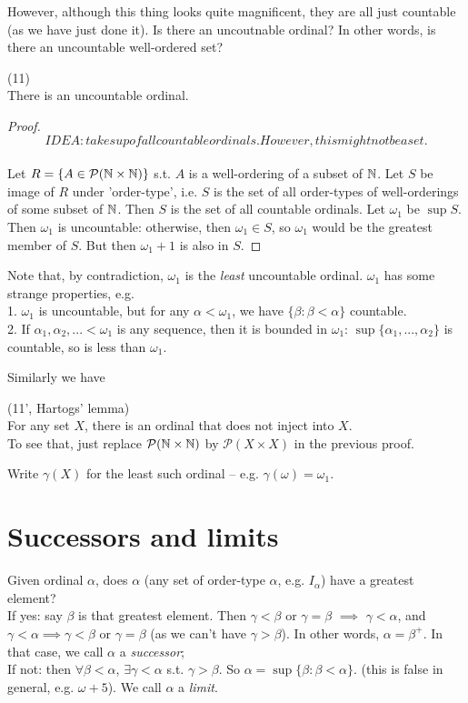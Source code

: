 \documentclass[a4paper]{article}
\begin{document}
However, although this thing looks quite magnificent, they are all just countable (as we have just done it). Is there an uncoutnable ordinal? In other words, is there an uncountable well-ordered set?

\begin{thm} (11)\\
There is an uncountable ordinal.
\begin{proof}
\[IDEA: take sup of all countable ordinals. However, this might not be a set.\]\\
Let $R=\{A \in \mathcal{P}(\mathbb{N} \times \mathbb{N})\}$ s.t. $A$ is a well-ordering of a subset of $\mathbb{N}$. Let $S$ be image of $R$ under 'order-type', i.e. $S$ is the set of all order-types of well-orderings of some subset of $\mathbb{N}$. Then $S$ is the set of all countable ordinals. Let $\omega_1$ be $\sup S$. Then $\omega_1$ is uncountable: otherwise, then $\omega_1 \in S$, so $\omega_1$ would be the greatest member of $S$. But then $\omega_1+1$ is also in $S$.
\end{proof}
\end{thm}

Note that, by contradiction, $\omega_1$ is the \emph{least} uncountable ordinal. $\omega_1$ has some strange properties, e.g.\\
1. $\omega_1$ is uncountable, but for any $\alpha < \omega_1$, we have $\{\beta:\beta < \alpha\}$ countable.\\
2. If $\alpha_1,\alpha_2,... < \omega_1$ is any sequence, then it is bounded in $\omega_1$: $\sup\{\alpha_1,...,\alpha_2\}$ is countable, so is less than $\omega_1$.

Similarly we have

\begin{thm} (11', Hartogs' lemma)\\
For any set $X$, there is an ordinal that  does not inject into $X$.\\
To see that, just replace $\mathcal{P}(\mathbb{N}\times\mathbb{N})$ by $\mathcal{P}(X \times X)$ in the previous proof.\\
\end{thm}

Write $\gamma(X)$ for the least such ordinal -- e.g. $\gamma(\omega) = \omega_1$.

\newpage

\section{Successors and limits}
Given ordinal $\alpha$, does $\alpha$ (any set of order-type $\alpha$, e.g. $I_\alpha$) have a greatest element?\\
If yes: say $\beta$ is that greatest element. Then $\gamma<\beta$ or $\gamma =\beta$ $\implies$ $\gamma<\alpha$, and $\gamma<\alpha \implies \gamma < \beta$ or $\gamma = \beta$ (as we can't have $\gamma > \beta$). In other words, $\alpha = \beta^+$. In that case, we call $\alpha$ a \emph{successor};\\
If not: then $\forall \beta < \alpha$, $\exists \gamma < \alpha$ s.t. $\gamma > \beta$. So $\alpha = \sup\{\beta:\beta < \alpha\}$. (this is false in general, e.g. $\omega+5$). We call $\alpha$ a \emph{limit}.
\end{document}
